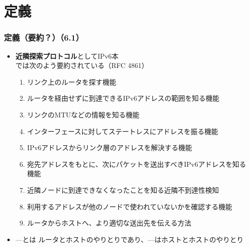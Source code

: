 \section{定義}

\begin{frame}
  \frametitle{定義（要約？）（6.1）}

  \begin{itemize}
    \item \textbf{近隣探索プロトコル}としてIPv6本\cite{小川晃通2021-12-20}では次のよう要約されている（RFC 4861）
    \begin{enumerate}
      \item リンク上のルータを探す機能\label{enum:protocol_1}
      \item ルータを経由せずに到達できるIPv6アドレスの範囲を知る機能
      \item リンクのMTUなどの情報を知る機能\label{enum:protocol_3}
      \item インターフェースに対してステートレスにアドレスを振る機能\label{enum:protocol_4}
      \item IPv6アドレスからリンク層のアドレスを解決する機能
      \item 宛先アドレスをもとに、次にパケットを送出すべきIPv6アドレスを知る機能
      \item 近隣ノードに到達できなくなったことを知る近隣不到達性検知
      \item 利用するアドレスが他のノードで使われていないかを確認する機能\label{enum:protocol_8}
      \item ルータからホストへ、より適切な送出先を伝える方法\label{enum:protocol_9}
    \end{enumerate}

    \item {}---とは
    ルータとホストのやりとりであり、---はホストとホストのやりとり
  \end{itemize}
\end{frame}

